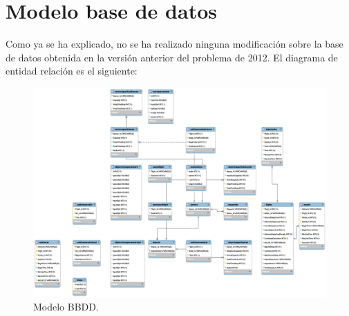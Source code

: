\section{Modelo base de datos}
Como ya se ha explicado, no se ha realizado ninguna modificación sobre la base de datos obtenida en la versión anterior del problema de 2012. El diagrama de entidad relación es el siguiente:
\begin{figure}[H]
	\begin{center}
		\centering
		\includegraphics[width=1\textwidth]{./imagenes/descripcion_problema/bbdd.png}
		\caption{Modelo BBDD.}
		\label{fig: Modelo BBDD}
	\end{center}
\end{figure}
